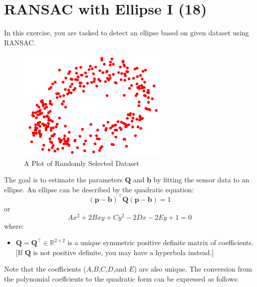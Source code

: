 \section{RANSAC with Ellipse I (18)}

In this exercise, you are tasked to detect an ellipse based on given dataset using RANSAC.
\begin{figure}[H]
    \centering
    \includegraphics[width=0.65\textwidth]{img/ellipse.png}
    \caption{A Plot of Randomly Selected Dataset}
    \label{fig:p3c1}
\end{figure}
The goal is to estimate the parameters $\mathbf{Q}$ and $\mathbf{b}$ by fitting the sensor data to an ellipse. 
An ellipse can be described by the quadratic equation: 
\begin{equation*}
(\mathbf{p}-\mathbf{b})^\top\mathbf{Q}(\mathbf{p}-\mathbf{b})=1
\end{equation*}
or
\begin{equation*}
    Ax^2+2Bxy+Cy^2-2Dx-2Ey+1=0
\end{equation*}
where:
\begin{itemize}
\item $\mathbf{Q}=\mathbf{Q}^\top\in\mathbb{R}^{2\times2}$ is a unique symmetric positive definite matrix of coefficients. [If $\mathbf{Q}$ is not positive definite, you may have a hyperbola instead.]
\end{itemize}
Note that the coefficients ($A$,$B$,$C$,$D$,and $E$) are also unique.
The conversion from the polynomial coeffcients to the quadratic form can be expressed as follows:
